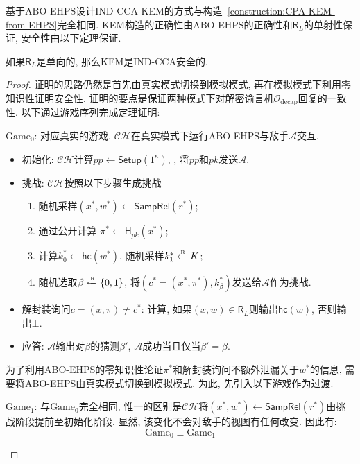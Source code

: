 基于ABO-EHPS设计IND-CCA KEM的方式与构造~\ref{construction:CPA-KEM-from-EHPS}完全相同. 
KEM构造的正确性由ABO-EHPS的正确性和$\mathsf{R}_L$的单射性保证, 安全性由以下定理保证.  
\begin{theorem}
如果$\mathsf{R}_L$是单向的, 那么KEM是IND-CCA安全的.  
\end{theorem}

\begin{proof}
证明的思路仍然是首先由真实模式切换到模拟模式, 再在模拟模式下利用零知识性证明安全性. 
证明的要点是保证两种模式下对解密谕言机$\mathcal{O}_\text{decap}$回复的一致性. 
以下通过游戏序列完成定理证明:

\begin{trivlist}
\item $\text{Game}_0$: 对应真实的游戏. $\mathcal{CH}$在真实模式下运行ABO-EHPS与敌手$\mathcal{A}$交互. 
\begin{itemize}
\item 初始化: $\mathcal{CH}$计算$pp \leftarrow \mathsf{Setup}(1^\kappa)$, 
	, 将$pp$和$pk$发送$\mathcal{A}$. 

\item 挑战: $\mathcal{CH}$按照以下步骤生成挑战
    \begin{enumerate}
        \item 随机采样$(x^*, w^*) \leftarrow \mathsf{SampRel}(r^*)$;  
        \item 通过公开计算
        	$\pi^* \leftarrow \mathsf{H}_{pk}(x^*)$; 
        \item 计算$k_0^* \leftarrow \mathsf{hc}(w^*)$, 随机采样$k_1^* \xleftarrow{\textup{\tiny R}} K$; 
        \item 随机选取$\beta \xleftarrow{\textup{\tiny R}} \{0,1\}$, 将$(c^* = (x^*, \pi^*), k_\beta^*)$发送给$\mathcal{A}$作为挑战. 
    \end{enumerate}

\item 解封装询问$c = (x, \pi) \neq c^*$: 计算, 
    如果$(x, w) \in \mathsf{R}_L$则输出$\mathsf{hc}(w)$, 否则输出$\bot$.

\item 应答: $\mathcal{A}$输出对$\beta$的猜测$\beta'$, $\mathcal{A}$成功当且仅当$\beta'= \beta$.
\end{itemize}
为了利用ABO-EHPS的零知识性论证$\pi^*$和解封装询问不额外泄漏关于$w^*$的信息, 
需要将ABO-EHPS由真实模式切换到模拟模式. 为此, 先引入以下游戏作为过渡.

\item $\text{Game}_1$: 与$\text{Game}_0$完全相同, 
	惟一的区别是$\mathcal{CH}$将$(x^*, w^*) \leftarrow \mathsf{SampRel}(r^*)$由挑战阶段提前至初始化阶段. 
	显然, 该变化不会对敌手的视图有任何改变. 因此有:
	\begin{equation*}
    	\text{Game}_0 \equiv \text{Game}_1
	\end{equation*}


\end{trivlist}
\end{proof}
